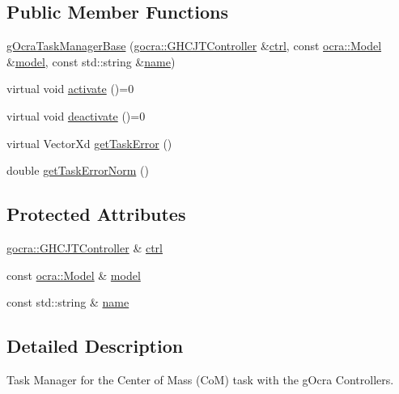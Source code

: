 \subsection*{Public Member Functions}
\begin{DoxyCompactItemize}
\item 
\hyperlink{classgocra_1_1gOcraTaskManagerBase_aeb3bde0cba73fbf7cf261f5293133f54}{g\+Ocra\+Task\+Manager\+Base} (\hyperlink{classgocra_1_1GHCJTController}{gocra\+::\+G\+H\+C\+J\+T\+Controller} \&\hyperlink{classgocra_1_1gOcraTaskManagerBase_a52d76d9b54d92f3d31faeaafda99e4c7}{ctrl}, const \hyperlink{classocra_1_1Model}{ocra\+::\+Model} \&\hyperlink{classgocra_1_1gOcraTaskManagerBase_adc439e7170f7120611fc6d009d06404e}{model}, const std\+::string \&\hyperlink{classgocra_1_1gOcraTaskManagerBase_adfda0d31ecfa9afea1380f076a472f37}{name})
\item 
virtual void \hyperlink{classgocra_1_1gOcraTaskManagerBase_a50cf1c408749d6e9dcfaf50bcab77dee}{activate} ()=0
\item 
virtual void \hyperlink{classgocra_1_1gOcraTaskManagerBase_a7cf9111e69aee47a39fe0f2976a20d6c}{deactivate} ()=0
\item 
virtual Vector\+Xd \hyperlink{classgocra_1_1gOcraTaskManagerBase_a5c40a14b3a1d5a6519da422310d28f97}{get\+Task\+Error} ()
\item 
double \hyperlink{classgocra_1_1gOcraTaskManagerBase_ab38cda0adc96728270cc881d83644fda}{get\+Task\+Error\+Norm} ()
\end{DoxyCompactItemize}
\subsection*{Protected Attributes}
\begin{DoxyCompactItemize}
\item 
\hyperlink{classgocra_1_1GHCJTController}{gocra\+::\+G\+H\+C\+J\+T\+Controller} \& \hyperlink{classgocra_1_1gOcraTaskManagerBase_a52d76d9b54d92f3d31faeaafda99e4c7}{ctrl}
\item 
const \hyperlink{classocra_1_1Model}{ocra\+::\+Model} \& \hyperlink{classgocra_1_1gOcraTaskManagerBase_adc439e7170f7120611fc6d009d06404e}{model}
\item 
const std\+::string \& \hyperlink{classgocra_1_1gOcraTaskManagerBase_adfda0d31ecfa9afea1380f076a472f37}{name}
\end{DoxyCompactItemize}


\subsection{Detailed Description}
Task Manager for the Center of Mass (CoM) task with the g\+Ocra Controllers. 



